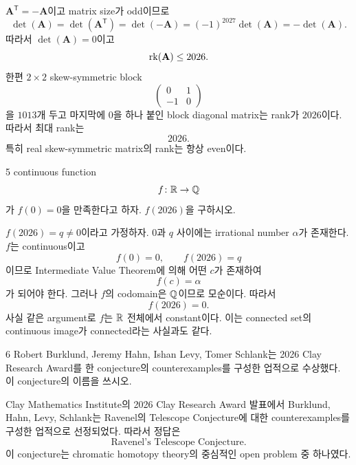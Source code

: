 \begin{solution}
$\mathbf{A}^{\mathsf T}=-\mathbf{A}$이고 matrix size가 odd이므로
\[
    \det(\mathbf{A})
    =\det(\mathbf{A}^{\mathsf T})
    =\det(-\mathbf{A})
    =(-1)^{2027}\det(\mathbf{A})
    =-\det(\mathbf{A}).
\]
따라서 $\det(\mathbf{A})=0$이고
\[
    \operatorname{rk}(\mathbf{A})\leq2026.
\]
한편 $2\times2$ skew-symmetric block
\[
    \begin{pmatrix}
        0&1\\
        -1&0
    \end{pmatrix}
\]
을 $1013$개 두고 마지막에 $0$을 하나 붙인 block diagonal matrix는 rank가 $2026$이다. 따라서 최대 rank는
\[
    \boxed{2026}.
\]
특히 real skew-symmetric matrix의 rank는 항상 even이다.
\end{solution}

\begin{problem}{5}
continuous function
\[
    f\colon\mathbb{R}\to\mathbb{Q}
\]
가 $f(0)=0$을 만족한다고 하자. $f(2026)$을 구하시오.
\end{problem}

\begin{solution}
$f(2026)=q\neq0$이라고 가정하자. $0$과 $q$ 사이에는 irrational number $\alpha$가 존재한다. $f$는 continuous이고
\[
    f(0)=0,
    \qquad
    f(2026)=q
\]
이므로 Intermediate Value Theorem에 의해 어떤 $c$가 존재하여
\[
    f(c)=\alpha
\]
가 되어야 한다. 그러나 $f$의 codomain은 $\mathbb{Q}$이므로 모순이다. 따라서
\[
    \boxed{f(2026)=0}.
\]
사실 같은 argument로 $f$는 $\mathbb{R}$ 전체에서 constant이다. 이는 connected set의 continuous image가 connected라는 사실과도 같다.
\end{solution}

\begin{problem}{6}
Robert Burklund, Jeremy Hahn, Ishan Levy, Tomer Schlank는 2026 Clay Research Award를 한 conjecture의 counterexamples를 구성한 업적으로 수상했다. 이 conjecture의 이름을 쓰시오.
\end{problem}

\begin{solution}
Clay Mathematics Institute의 2026 Clay Research Award 발표에서 Burklund, Hahn, Levy, Schlank는 Ravenel의 Telescope Conjecture에 대한 counterexamples를 구성한 업적으로 선정되었다. 따라서 정답은
\[
    \boxed{\text{Ravenel's Telescope Conjecture}}.
\]
이 conjecture는 chromatic homotopy theory의 중심적인 open problem 중 하나였다.
\end{solution}

